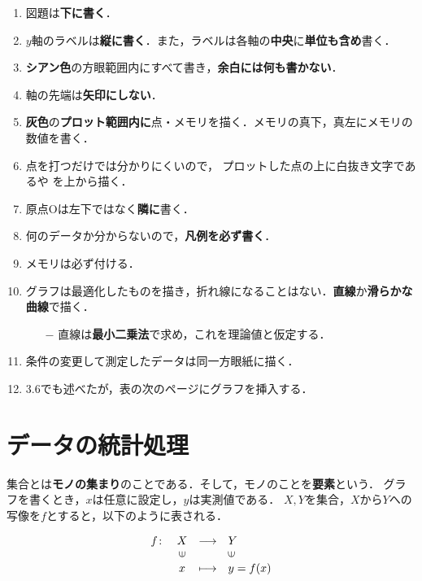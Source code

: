 \documentclass[a4paper,11pt]{ltjsarticle}
\begin{document}
    \begin{enumerate}[label={\color{magenta}\arabic*. }]
        \item 図題は\textbf{下に書く}．
        \item $y$軸のラベルは\textbf{縦に書く}．また，ラベルは各軸の\textbf{中央}に\textbf{単位も含め}書く．
        \item {\color{cyan}\textbf{シアン色}}の方眼範囲内にすべて書き，\textbf{余白には何も書かない}．
        \item 軸の先端は\textbf{矢印にしない}．
        \item {\color{gray}\textbf{灰色}}の\textbf{プロット範囲内に}点・メモリを描く．メモリの真下，真左にメモリの数値を書く．
        \item 点を打つだけでは分かりにくいので， プロットした点の上に白抜き文字である\bigcirc や \square を上から描く．
        \item 原点Oは左下ではなく\textbf{隣に}書く．
        \item 何のデータか分からないので，\textbf{凡例を必ず書く}．
        \item メモリは必ず付ける．
        \item グラフは最適化したものを描き，折れ線になることはない．\textbf{直線}か\textbf{滑らかな曲線}で描く．
        \begin{itemize}
            \item[{\color{magenta}$-$}] 直線は\textbf{最小二乗法}で求め，これを理論値と仮定する．
        \end{itemize}
        \item 条件の変更して測定したデータは同一方眼紙に描く．
        \item 3.6でも述べたが，表の次のページにグラフを挿入する．
    \end{enumerate}

\clearpage


\section{データの統計処理}

集合とは\textbf{モノの集まり}のことである．そして，モノのことを\textbf{要素}という．
グラフを書くとき，$x$は任意に設定し，$y$は実測値である．
$X, Y$を集合，$X$から$Y$への写像を$f$とすると，以下のように表される．

\begin{equation*}
    \begin{array}{rccl}
        f\colon & X                     & \longrightarrow & Y                     \\
                & \rotatebox{90}{$\in$} &                 & \rotatebox{90}{$\in$} \\
                & x                     & \longmapsto     & y=f(x)
    \end{array}
\end{equation*}
\end{document}

